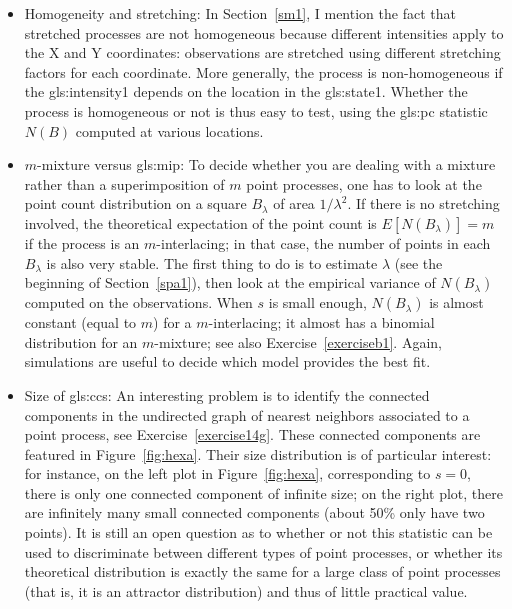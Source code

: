 \documentclass[10pt]{article}
\begin{document}
\begin{itemize}
\item \textcolor{index}{Homogeneity} and \textcolor{index}{stretching}: In Section~\ref{sm1}, I mention the fact that stretched processes are not homogeneous because different intensities apply to the X and Y coordinates: observations are stretched using different stretching factors for each coordinate. More generally, the process is non-homogeneous if the \gls{gls:intensity1} depends on the location
in the \gls{gls:state1}. Whether the process is homogeneous or not is thus easy to test, using the \gls{gls:pc} statistic
$N(B)$ computed at various locations.
\item \textcolor{index}{$m$-mixture} versus 
\gls{gls:mip}: To decide whether you are dealing with a mixture rather than a superimposition of $m$ point processes, one has to look at the point count distribution on a square $B_\lambda$ of area $1/\lambda^2$. If there is no stretching involved, the theoretical expectation of the point count is $E[N(B_\lambda)]=m$ if the process is an $m$-interlacing; in that case, the number of points in each $B_\lambda$ is also very stable. The first thing to do is to estimate $\lambda$ (see the beginning of Section~\ref{spa1}), then look at the empirical variance of $N(B_\lambda)$ computed on the observations. When $s$ is small enough, $N(B_\lambda)$ is almost constant (equal to $m$) for a $m$-interlacing; it almost has a 
\textcolor{index}{binomial distribution} for an $m$-mixture; see also Exercise~\ref{exerciseb1}. Again, simulations are useful to decide which model provides the best fit.
\item Size of \glspl{gls:cc}: An interesting problem is to identify the connected components in the 
\textcolor{index}{undirected graph} of nearest neighbors associated to a point process, see Exercise~\ref{exercise14g}. These 
connected components are featured in Figure~\ref{fig:hexa}. Their size distribution is of particular interest: for instance, on the left plot in  Figure~\ref{fig:hexa},
corresponding to $s=0$, there is only one connected component of infinite size; on the right plot, there are infinitely many small connected components (about 50\% only have two points). It is still an open question as to whether or not this statistic can be used to discriminate between different types of point processes, or whether its theoretical distribution is exactly the same for a large class of point processes (that is, it is an \textcolor{index}{attractor distribution}) and thus of little practical value.  
\end{itemize}
\end{document}
